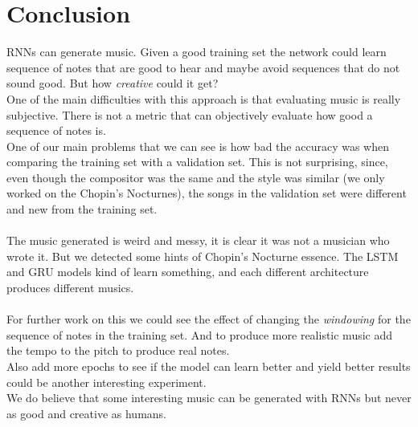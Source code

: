 \documentclass[11pt]
{article}
\begin{document}
\section{Conclusion}
RNNs can generate music. 
Given a good training set the network could learn sequence of notes that are good to hear and maybe avoid sequences that do not sound good.
But how \textit{creative} could it get?\\
One of the main difficulties with this approach is that evaluating music is really subjective.
There is not a metric that can objectively evaluate how good a sequence of notes is.\\
One of our main problems that we can see is how bad the accuracy was when comparing the training set with a validation set.
This is not surprising, since,  even though the compositor was the same and the style was similar (we only worked on the Chopin's Nocturnes), the songs in the validation set were different and new from the training set.\\
\\

The music generated is weird and messy, it is clear it was not  a musician who wrote it. But we detected some hints of Chopin's Nocturne essence.
The LSTM and GRU models kind of learn something, and each different architecture produces different musics.\\
\\

For further work on this we could see the effect of changing the \textit{windowing} for the sequence of notes in the training set.
And to produce more realistic music add the tempo to the pitch to produce real notes.\\
Also add more epochs to see if the model can learn better and yield better results could be another interesting experiment.\\
We do believe that some interesting music can be generated with RNNs but never as good and creative as humans.



\end{document}
